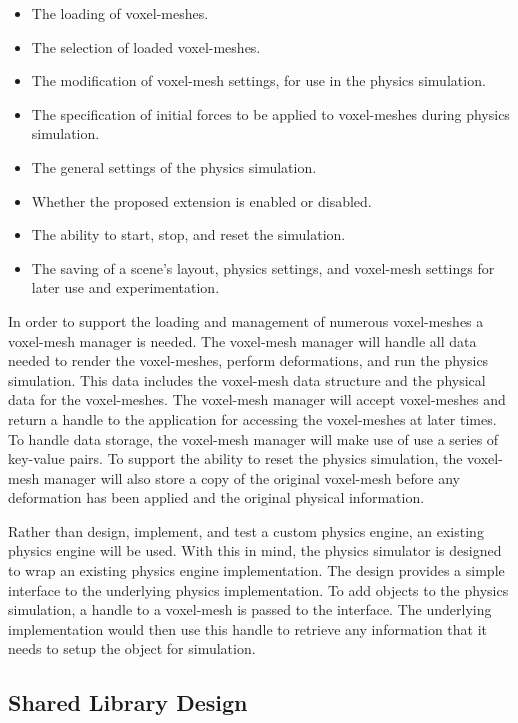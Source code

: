 \begin{itemize}
  \item The loading of voxel-meshes.
  \item The selection of loaded voxel-meshes.
  \item The modification of voxel-mesh settings, for use in the physics simulation.
  \item The specification of initial forces to be applied to voxel-meshes during physics simulation.
  \item The general settings of the physics simulation.
  \item Whether the proposed extension is enabled or disabled.
  \item The ability to start, stop, and reset the simulation.
  \item The saving of a scene's layout, physics settings, and voxel-mesh settings for later use and
  experimentation.
\end{itemize}

In order to support the loading and management of numerous voxel-meshes a voxel-mesh manager is 
needed. The voxel-mesh manager will handle all data needed to render the voxel-meshes, perform
deformations, and run the physics simulation. This data includes the voxel-mesh data structure and
the physical data for the voxel-meshes. The voxel-mesh manager will accept voxel-meshes and return a 
handle to the application for accessing the voxel-meshes at later times. 
To handle data storage, the voxel-mesh manager will make use of use a series of key-value pairs. To 
support the ability to reset the physics simulation, the voxel-mesh manager will also store a
copy of the original voxel-mesh before any deformation has been applied and the original physical 
information.

Rather than design, implement, and test a custom physics engine, an existing physics engine will be
used. With this in mind, the physics simulator is designed to wrap an existing physics engine 
implementation. The design provides a simple interface to the underlying physics implementation. To 
add objects to the physics simulation, a handle to a voxel-mesh is passed to the interface. The 
underlying implementation would then use this handle to retrieve any information that it needs to 
setup the object for simulation. 

\subsection{Shared Library Design} \label{SharedLibrary}

